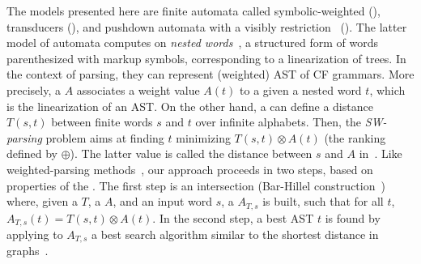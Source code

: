 %
%
The models presented here are finite automata called symbolic-weighted (\SWA),
transducers (\SWT), and pushdown automata
with a visibly restriction~\cite{AlurMadhusudan09nested} (\SWVPA).
The latter model of automata computes on \emph{nested words}~\cite{AlurMadhusudan09nested}, 
a structured form of words parenthesized with markup symbols, 
corresponding to a linearization of trees.
In the context of parsing, they can represent (weighted) AST of CF grammars.
More precisely, a \SWVPA $A$ associates a weight value $A(t)$ %
to a given a nested word $t$, which is the linearization of an AST. %
%
On the other hand, 
a \SWT can define a distance $T(s, t)$ between finite words $s$ and $t$
over infinite alphabets. %
Then, the \emph{SW-parsing} problem aims at %
finding $t$ minimizing 
$T(s, t) \otimes A(t)$ (\wrt the ranking defined by $\oplus$).
The latter value is called the distance between $s$ and $A$ in~\cite{Mohri03EDWA}.
%
Like weighted-parsing 
methods~\cite{Goodman99SemiringParsing,Nederhof03weightedParsing,MorbitzVogler19weighted-parsing}, 
our approach proceeds in two steps, 
based on properties of the \swM. 
The first step is an intersection 
(Bar-Hillel construction~\cite{GruneJacobs08parsing}) 
where, given a \SWT $T$, a \SWVPA $A$, and an input word $s$, 
a \SWVPA $A_{T, s}$ is built, such that for all $t$, $A_{T, s}(t) = T(s, t) \otimes A(t)$.
In the second step, a best AST $t$ is found by applying to $A_{T, s}$ 
a best search algorithm similar to the shortest distance 
in graphs~\cite{Mohri02semiring,Huang05kbest}.
%

